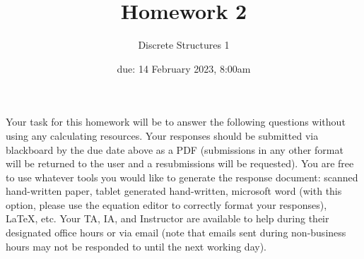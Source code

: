 \documentclass[11pt, oneside]{article}   	%
\title{Homework 2}
\author{Discrete Structures 1}
\date{due: 14 February 2023, 8:00am}							%
\begin{document}
\maketitle

Your task for this homework will be to answer the following questions without using any calculating resources. 
Your responses should be submitted via blackboard by the due date above as a PDF (submissions in any other format will be returned to the user and a resubmissions will be requested). 
You are free to use whatever tools you would like to generate the response document: 
scanned hand-written paper, 
tablet generated hand-written, 
microsoft word (with this option, please use the equation editor to correctly format your responses), 
\LaTeX, etc.
Your TA, IA, and Instructor are available to help during their designated office hours or via email 
(note that emails sent during non-business hours may not be responded to until the next working day). 
\end{document}
